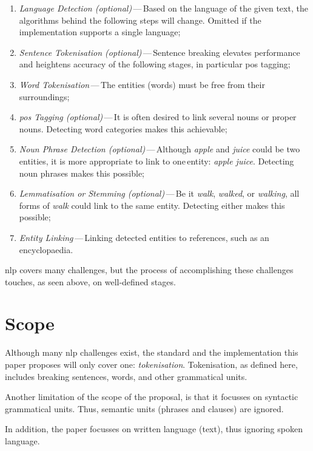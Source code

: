 \begin{enumerate}
\item\emph{Language Detection (optional)}\,---\,Based on the language of the
    given text, the algorithms behind the following steps will change.
  Omitted if the implementation supports a single language;
\item\emph{Sentence Tokenisation (optional)}\,---\,Sentence breaking elevates
    performance and heightens accuracy of the following stages, in
    particular \acrshort{pos} tagging;
\item\emph{Word Tokenisation}\,---\,The entities (words) must be free from
  their surroundings;
\item\emph{\acrfull{pos} Tagging (optional)}\,---\,It is often desired to link
    several nouns or proper nouns.
  Detecting word categories makes this achievable;
\item\emph{Noun Phrase Detection (optional)}\,---\,Although \emph{apple} and
    \emph{juice} could be two\,entities, it is more appropriate to link to
    one\,entity: \emph{apple juice}.
  Detecting noun phrases makes this possible;
\item\emph{Lemmatisation or Stemming (optional)}\,---\,Be it \emph{walk},
    \emph{walked}, or \emph{walking}, all forms of \emph{walk} could link
    to the same entity.
  Detecting either makes this possible;
\item\emph{Entity Linking}\,---\,Linking detected entities to references, such
    as an encyclopaedia.
\end{enumerate}

\noindent \gls{nlp} covers many challenges, but the process of accomplishing
  these challenges touches, as seen above, on well-defined stages.

\section{Scope}\label{scope}

Although many \gls{nlp} challenges exist, the standard and the implementation
  this paper proposes will only cover one: \emph{tokenisation}.
Tokenisation, as defined here, includes breaking sentences, words, and
other grammatical units.

Another limitation of the scope of the proposal, is that it focusses on
  syntactic grammatical units. Thus, semantic units (phrases and clauses)
  are ignored.

In addition, the paper focusses on written language (text), thus ignoring
  spoken language.

